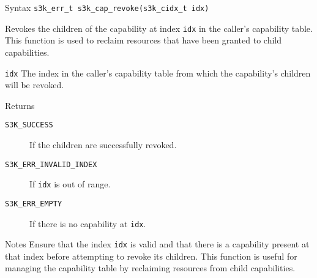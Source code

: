 \documentclass[a4paper,11pt]{article}
\newcommand{\syscall}[1]{\texttt{#1}}
\newenvironment{syscalldoc}[1]{
  \begin{tcolorbox}[breakable,title=\subsection{\syscall{#1}}]
  \begin{description}[leftmargin=!,style=nextline,noitemsep]
}{
  \end{description}
  \end{tcolorbox}
}
\begin{document}
\begin{syscalldoc}{s3k\_cap\_revoke}
  \item[Syntax] \lstinline{s3k_err_t s3k_cap_revoke(s3k_cidx_t idx)}

  \item[Description] Revokes the children of the capability at index \verb|idx| in the caller's capability table. This function is used to reclaim resources that have been granted to child capabilities.

  \item[Parameters]
    \begin{description}
      \item[]
      \item[\texttt{idx}] The index in the caller's capability table from which the capability's children will be revoked.
    \end{description}

  \item[Returns]
    \begin{description}
      \item[]
      \item[\texttt{S3K\_SUCCESS}] If the children are successfully revoked.
      \item[\texttt{S3K\_ERR\_INVALID\_INDEX}] If \verb|idx| is out of range.
      \item[\texttt{S3K\_ERR\_EMPTY}] If there is no capability at \verb|idx|.
    \end{description}

  \item[Notes] Ensure that the index \verb|idx| is valid and that there is a capability present at that index before attempting to revoke its children. This function is useful for managing the capability table by reclaiming resources from child capabilities.
\end{syscalldoc}
\end{document}
